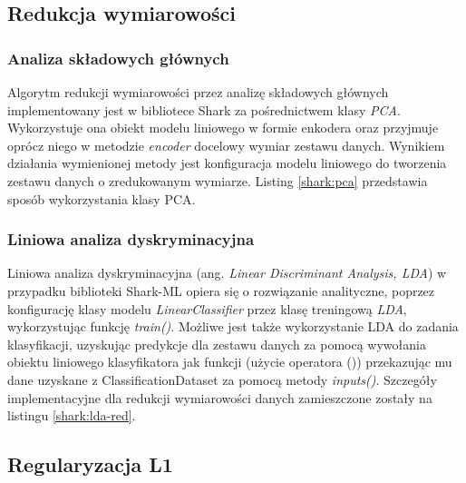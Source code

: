 
\subsection{Redukcja wymiarowości}
\subsubsection{Analiza składowych głównych}
Algorytm redukcji wymiarowości przez analizę składowych głównych implementowany jest w bibliotece Shark za pośrednictwem klasy \textit{PCA}. Wykorzystuje ona obiekt modelu liniowego w formie enkodera oraz przyjmuje oprócz niego w metodzie \textit{encoder} docelowy wymiar zestawu danych. Wynikiem działania wymienionej metody jest konfiguracja modelu liniowego do tworzenia zestawu danych o zredukowanym wymiarze. Listing \ref{shark:pca} przedstawia sposób wykorzystania klasy PCA.



\subsubsection{Liniowa analiza dyskryminacyjna}

Liniowa analiza dyskryminacyjna (ang. \textit{Linear Discriminant Analysis, LDA}) w przypadku biblioteki Shark-ML opiera się o rozwiązanie analityczne, poprzez konfigurację klasy modelu \textit{LinearClassifier} przez klasę treningową \textit{LDA}, wykorzystując funkcję \textit{train()}. Możliwe jest także wykorzystanie LDA do zadania klasyfikacji, uzyskując predykcje dla zestawu danych za pomocą wywołania obiektu liniowego klasyfikatora jak funkcji (użycie operatora ()) przekazując mu dane uzyskane z ClassificationDataset za pomocą metody \textit{inputs()}. Szczegóły implementacyjne dla redukcji wymiarowości danych zamieszczone zostały na listingu \ref{shark:lda-red}.


\subsection{Regularyzacja L1}

